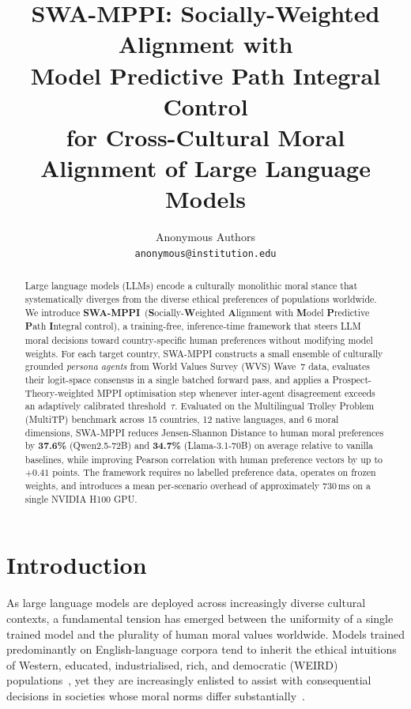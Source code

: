 \documentclass{article}
\title{%
  \textbf{SWA-MPPI}: Socially-Weighted Alignment with\\
  Model Predictive Path Integral Control\\
  for Cross-Cultural Moral Alignment of Large Language Models%
}
\author{%
  Anonymous Authors\\
  \texttt{anonymous@institution.edu}
}
\begin{document}
\maketitle

\begin{abstract}
Large language models (LLMs) encode a culturally monolithic moral stance that
systematically diverges from the diverse ethical preferences of populations worldwide.
We introduce \textbf{SWA-MPPI}~(\textbf{S}ocially-\textbf{W}eighted \textbf{A}lignment
with \textbf{M}odel \textbf{P}redictive \textbf{P}ath \textbf{I}ntegral control), a
training-free, inference-time framework that steers LLM moral decisions toward
country-specific human preferences without modifying model weights. For each target
country, SWA-MPPI constructs a small ensemble of culturally grounded \emph{persona agents}
from World Values Survey (WVS) Wave~7 data, evaluates their logit-space consensus in a
single batched forward pass, and applies a Prospect-Theory-weighted MPPI optimisation
step whenever inter-agent disagreement exceeds an adaptively calibrated
threshold~$\tau$. Evaluated on the Multilingual Trolley Problem (MultiTP) benchmark
across 15 countries, 12 native languages, and 6 moral dimensions, SWA-MPPI reduces
Jensen-Shannon Distance to human moral preferences by \textbf{37.6\%} (Qwen2.5-72B)
and \textbf{34.7\%} (Llama-3.1-70B) on average relative to vanilla baselines, while
improving Pearson correlation with human preference vectors by up to $+0.41$ points.
The framework requires no labelled preference data, operates on frozen weights, and
introduces a mean per-scenario overhead of approximately 730\,ms on a single
NVIDIA H100 GPU.
\end{abstract}

\section{Introduction}
\label{sec:intro}

As large language models are deployed across increasingly diverse cultural contexts, a
fundamental tension has emerged between the uniformity of a single trained model and the
plurality of human moral values worldwide. Models trained predominantly on English-language
corpora tend to inherit the ethical intuitions of Western, educated, industrialised, rich,
and democratic (WEIRD) populations~\citep{henrich2010weirdest}, yet they are increasingly
enlisted to assist with consequential decisions in societies whose moral norms differ
substantially~\citep{awad2018moral, jin2025multitp}.
\end{document}
